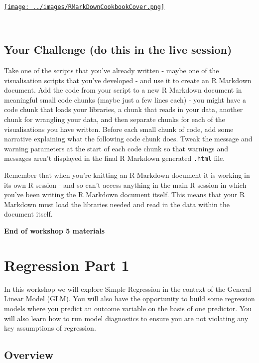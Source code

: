 \documentclass[
]{book}
\begin{document}
~~

\href{https://bookdown.org/yihui/rmarkdown-cookbook/}{\texttt{[image: ../images/RMarkDownCookbookCover.png]}}

~~

\hypertarget{your-challenge-do-this-in-the-live-session-1}{%
\section{Your Challenge (do this in the live session)}\label{your-challenge-do-this-in-the-live-session-1}}

Take one of the scripts that you've already written - maybe one of the visualisation scripts that you've developed - and use it to create an R Markdown document. Add the code from your script to a new R Markdown document in meaningful small code chunks (maybe just a few lines each) - you might have a code chunk that loads your libraries, a chunk that reads in your data, another chunk for wrangling your data, and then separate chunks for each of the visualisations you have written. Before each small chunk of code, add some narrative explaining what the following code chunk does. Tweak the message and warning parameters at the start of each code chunk so that warnings and messages aren't displayed in the final R Markdown generated \texttt{.html} file.

Remember that when you're knitting an R Markdown document it is working in its own R session - and so can't access anything in the main R session in which you've been writing the R Markdown document itself. This means that your R Markdown must load the libraries needed and read in the data within the document itself.

\textbf{End of workshop 5 materials}

\hypertarget{regression-part-1}{%
\chapter{Regression Part 1}\label{regression-part-1}}

In this workshop we will explore Simple Regression in the context of the General Linear Model (GLM). You will also have the opportunity to build some regression models where you predict an outcome variable on the basis of one predictor. You will also learn how to run model diagnostics to ensure you are not violating any key assumptions of regression.

\hypertarget{overview-1}{%
\section{Overview}\label{overview-1}}
\end{document}
